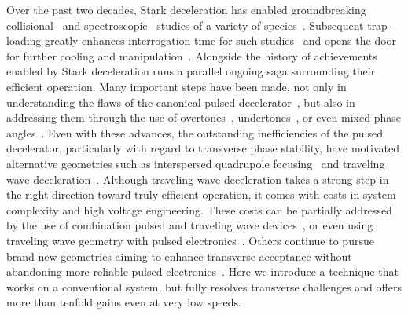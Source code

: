\documentclass[%
 reprint,
 amsmath,amssymb,
 aps,
prl,
]{revtex4-1}
\begin{document}
Over the past two decades, Stark deceleration has enabled groundbreaking collisional~\cite{Sawyer2011,Kirste2012,Gao2018} and spectroscopic~\cite{Veldhoven2004,Hudson2006,Lev2006,Fast2018} studies of a variety of species~\cite{VanDeMeerakker2012}. 
Subsequent trap-loading greatly enhances interrogation time for such studies~\cite{Sawyer2008} and opens the door for further cooling and manipulation~\cite{Stuhl2012evap, Reens2017}. 
Alongside the history of achievements enabled by Stark deceleration runs a parallel ongoing saga surrounding their efficient operation. 
Many important steps have been made, not only in understanding the flaws of the canonical pulsed decelerator~\cite{VanDeMeerakker2006,Sawyer2008a}, but also in addressing them through the use of overtones~\cite{VanDeMeerakker2005a,Scharfenberg2009}, undertones~\cite{Zhang2016}, or even mixed phase angles~\cite{Parazzoli2009,Hou2013}. 
Even with these advances, the outstanding inefficiencies of the pulsed decelerator, particularly with regard to transverse phase stability, have motivated alternative geometries such as interspersed quadrupole focusing~\cite{Sawyer2008a} and traveling wave deceleration~\cite{Osterwalder2010,VandenBerg2014,Fabrikant2014}. 
Although traveling wave deceleration takes a strong step in the right direction toward truly efficient operation, it comes with costs in system complexity and high voltage engineering. 
These costs can be partially addressed by the use of combination pulsed and traveling wave devices~\cite{Quintero-Perez2013}, or even using traveling wave geometry with pulsed electronics~\cite{Hou2016,Shyur2017}. 
Others continue to pursue brand new geometries aiming to enhance transverse acceptance without abandoning more reliable pulsed electronics~\cite{Wang2016}. 
Here we introduce a technique that works on a conventional system, but fully resolves transverse challenges and offers more than tenfold gains even at very low speeds.
\end{document}
